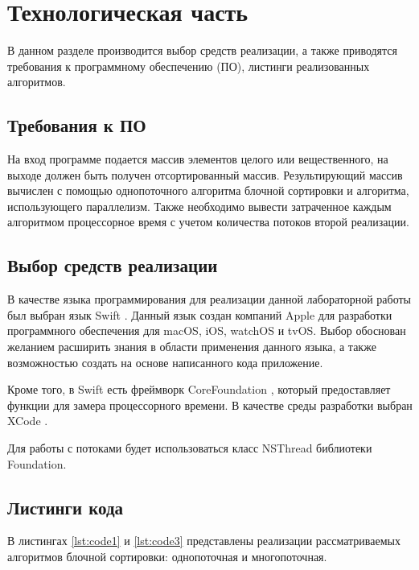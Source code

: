 \chapter{Технологическая часть}

В данном разделе производится выбор средств реализации, а также приводятся требования к программному обеспечению (ПО), листинги реализованных алгоритмов.

\section{Требования к ПО}

На вход программе подается массив элементов целого или вещественного, на выходе должен быть получен отсортированный массив. 
Результирующий массив вычислен с помощью однопоточного алгоритма блочной сортировки и алгоритма, использующего параллелизм. 
Также необходимо вывести затраченное каждым алгоритмом процессорное время с учетом количества потоков второй реализации.

\section{Выбор средств реализации}

В качестве языка программирования для реализации данной лабораторной работы был выбран язык Swift \cite{swift}. 
Данный язык создан компаний Apple для разработки программного обеспечения для macOS, iOS, watchOS и tvOS. 
Выбор обоснован желанием расширить знания в области применения данного языка, а также возможностью создать на основе написанного кода приложение.

Кроме того, в Swift есть фреймворк CoreFoundation \cite{core}, который предоставляет функции для замера процессорного времени. 
В качестве среды разработки выбран XCode \cite{xcode}. 

Для работы с потоками будет использоваться класс NSThread \cite{thread} библиотеки Foundation. 

\section{Листинги кода}

В листингах \ref{lst:code1} и \ref{lst:code3} представлены реализации рассматриваемых алгоритмов блочной сортировки: однопоточная и многопоточная. 

